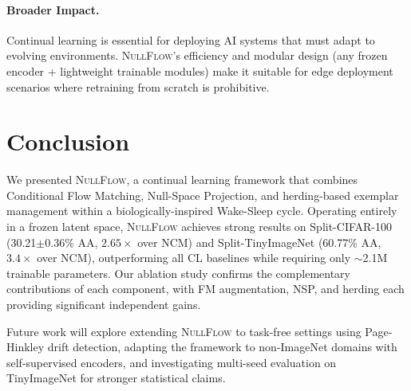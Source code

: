 \documentclass[10pt,twocolumn,letterpaper]{article}
\newcommand{\ours}{\textsc{NullFlow}}
\begin{document}
\paragraph{Broader Impact.}
Continual learning is essential for deploying AI systems that must adapt to evolving environments. \ours{}'s efficiency and modular design (any frozen encoder + lightweight trainable modules) make it suitable for edge deployment scenarios where retraining from scratch is prohibitive.

\section{Conclusion}
\label{sec:conclusion}

We presented \ours{}, a continual learning framework that combines Conditional Flow Matching, Null-Space Projection, and herding-based exemplar management within a biologically-inspired Wake-Sleep cycle. Operating entirely in a frozen latent space, \ours{} achieves strong results on Split-CIFAR-100 (30.21$\pm$0.36\% AA, $2.65\times$ over NCM) and Split-TinyImageNet (60.77\% AA, $3.4\times$ over NCM), outperforming all CL baselines while requiring only $\sim$2.1M trainable parameters. Our ablation study confirms the complementary contributions of each component, with FM augmentation, NSP, and herding each providing significant independent gains.

Future work will explore extending \ours{} to task-free settings using Page-Hinkley drift detection, adapting the framework to non-ImageNet domains with self-supervised encoders, and investigating multi-seed evaluation on TinyImageNet for stronger statistical claims.
\end{document}
